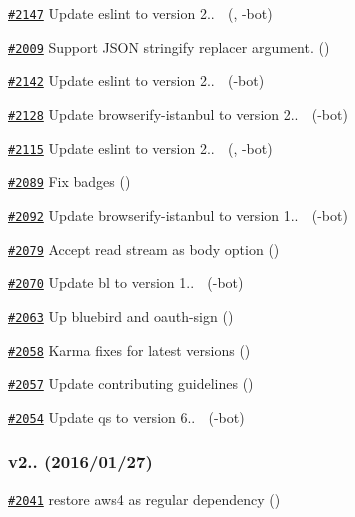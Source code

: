 \begin{DoxyItemize}
\item \href{https://github.com/request/request/pull/2147}{\tt \#2147} Update eslint to version 2.. 🚀 (, -\/bot)
\item \href{https://github.com/request/request/pull/2009}{\tt \#2009} Support J\+S\+ON stringify replacer argument. ()
\item \href{https://github.com/request/request/pull/2142}{\tt \#2142} Update eslint to version 2.. 🚀 (-\/bot)
\item \href{https://github.com/request/request/pull/2128}{\tt \#2128} Update browserify-\/istanbul to version 2.. 🚀 (-\/bot)
\item \href{https://github.com/request/request/pull/2115}{\tt \#2115} Update eslint to version 2.. 🚀 (, -\/bot)
\item \href{https://github.com/request/request/pull/2089}{\tt \#2089} Fix badges ()
\item \href{https://github.com/request/request/pull/2092}{\tt \#2092} Update browserify-\/istanbul to version 1.. 🚀 (-\/bot)
\item \href{https://github.com/request/request/pull/2079}{\tt \#2079} Accept read stream as body option ()
\item \href{https://github.com/request/request/pull/2070}{\tt \#2070} Update bl to version 1.. 🚀 (-\/bot)
\item \href{https://github.com/request/request/pull/2063}{\tt \#2063} Up bluebird and oauth-\/sign ()
\item \href{https://github.com/request/request/pull/2058}{\tt \#2058} Karma fixes for latest versions ()
\item \href{https://github.com/request/request/pull/2057}{\tt \#2057} Update contributing guidelines ()
\item \href{https://github.com/request/request/pull/2054}{\tt \#2054} Update qs to version 6.. 🚀 (-\/bot)
\end{DoxyItemize}

\subsubsection*{v2.. (2016/01/27)}


\begin{DoxyItemize}
\item \href{https://github.com/request/request/pull/2041}{\tt \#2041} restore aws4 as regular dependency ()
\end{DoxyItemize}

